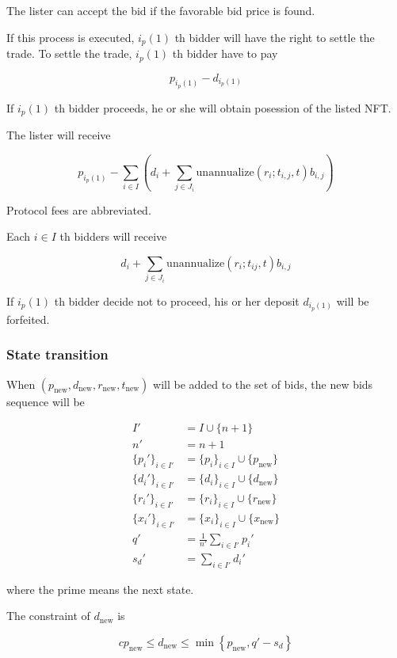 \documentclass[dvipdfmx]{jsarticle}
\begin{document}
The lister can accept the bid if the favorable bid price is found.

If this process is executed, $i_p(1)$ th bidder will have the right to settle the trade.
To settle the trade, $i_p(1)$ th bidder have to pay

$$
  p_{i_p(1)} - d_{i_p(1)}
$$

If $i_p(1)$ th bidder proceeds, he or she will obtain posession of the listed NFT.

The lister will receive

$$
  p_{i_p(1)} - \sum_{i \in I} \left( d_i + \sum_{j \in J_i} \text{unannualize}(r_i; t_{i,j}, t) b_{i,j} \right)
$$

Protocol fees are abbreviated.

Each $i \in I$ th bidders will receive

$$
  d_i + \sum_{j \in J_i} \text{unannualize}(r_i; t_{ij}, t) b_{i,j}
$$

If $i_p(1)$ th bidder decide not to proceed, his or her deposit $d_{i_p(1)}$ will be forfeited.

\subsubsection{State transition}

When $(p_{\text{new}}, d_{\text{new}}, r_{\text{new}}, t_{\text{new}})$ will be added to the set of bids, the new bids sequence will be

$$
\begin{aligned}
  I' &= I \cup \{n+1\} \\
  n' &= n + 1 \\
  \{p_i'\}_{i \in I'} &= \{p_i\}_{i \in I} \cup \{p_{\text{new}}\} \\
  \{d_i'\}_{i \in I'} &= \{d_i\}_{i \in I} \cup \{d_{\text{new}}\} \\
  \{r_i'\}_{i \in I'} &= \{r_i\}_{i \in I} \cup \{r_{\text{new}}\} \\
  \{x_i'\}_{i \in I'} &= \{x_i\}_{i \in I} \cup \{x_{\text{new}}\} \\
  q' &= \frac{1}{n'} \sum_{i \in I'} p_i' \\
  s_d' &= \sum_{i \in I'} d_i'
\end{aligned}
$$

where the prime means the next state.

The constraint of $d_{\text{new}}$ is

$$
  c p_{\text{new}} \le d_{\text{new}} \le \min \left\{ p_{\text{new}}, q' - s_d \right\} 
$$
\end{document}
